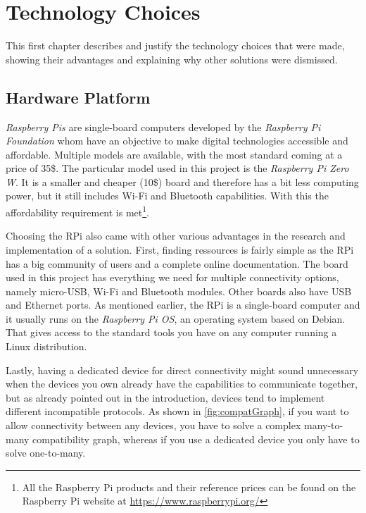 \documentclass[a4paper,11pt,oneside]{report}
\begin{document}
\chapter{Technology Choices}
 \label{chap:technology}

This first chapter describes and justify the technology choices that were made, showing their advantages and explaining why other solutions were dismissed.

\section{Hardware Platform}

\emph{Raspberry Pis} are single-board computers developed by the \emph{Raspberry Pi Foundation} whom have an objective to make digital technologies accessible and affordable. Multiple models are available, with the most standard coming at a price of 35\$. The particular model used in this project is the \emph{Raspberry Pi Zero W}. It is a smaller and cheaper (10\$) board and therefore has a bit less computing power, but it still includes Wi-Fi and Bluetooth capabilities. With this the affordability requirement is met\footnote{All the Raspberry Pi products and their reference prices can be found on the Raspberry Pi website at \url{https://www.raspberrypi.org/}}.

Choosing the RPi also came with other various advantages in the research and implementation of a solution. First, finding ressources is fairly simple as the RPi has a big community of users and a complete online documentation. The board used in this project has everything we need for multiple connectivity options, namely micro-USB, Wi-Fi and Bluetooth modules. Other boards also have USB and Ethernet ports. As mentioned earlier, the RPi is a single-board computer and it usually runs on the \emph{Raspberry Pi OS}, an operating system based on Debian. That gives access to the standard tools you have on any computer running a Linux distribution.

Lastly, having a dedicated device for direct connectivity might sound unnecessary when the devices you own already have the capabilities to communicate together, but as already pointed out in the introduction, devices tend to implement different incompatible protocols. As shown in \autoref{fig:compatGraph}, if you want to allow connectivity between any devices, you have to solve a complex many-to-many compatibility graph, whereas if you use a dedicated device you only have to solve one-to-many.
\end{document}
